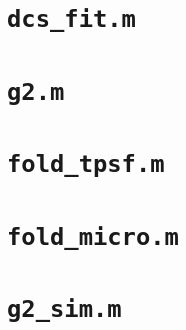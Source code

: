 \section{\texttt{dcs\_fit.m}} \label{code:dcs_fit}


\section{\texttt{g2.m}} \label{code:g2}


\section{\texttt{fold\_tpsf.m}} \label{code:fold_tpsf}


\section{\texttt{fold\_micro.m}} \label{code:fold_micro}


\section{\texttt{g2\_sim.m}} \label{code:g2_sim}




\printbibliography[heading=bibintoc, title={References}]

%